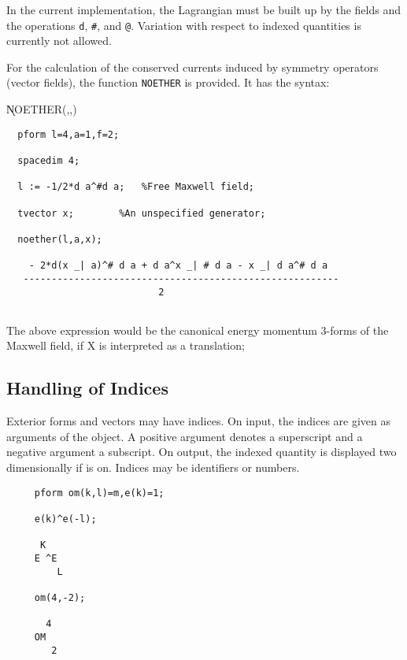 In the current implementation, the Lagrangian must be built up by the
fields and the operations \texttt{d}, \texttt{\#}, and \texttt{@}. Variation
with respect to indexed quantities is currently not allowed.

For the calculation of the conserved currents induced by symmetry
operators (vector fields), the function \texttt{NOETHER}\label{NOETHER}
\hypertarget{operator:NOETHER}{}
is provided.  It has the syntax:

\hspace*{2em}
\k{NOETHER}(,,)

\example{}
\begin{verbatim}
  pform l=4,a=1,f=2;

  spacedim 4;

  l := -1/2*d a^#d a;   %Free Maxwell field;

  tvector x;        %An unspecified generator;

  noether(l,a,x);

    - 2*d(x _| a)^# d a + d a^x _| # d a - x _| d a^# d a
   --------------------------------------------------------
                           2


\end{verbatim}

The above expression would be the canonical energy
momentum 3-forms of the Maxwell field, if X is interpreted
as a translation;



\subsection{Handling of Indices}
Exterior forms and vectors may have indices.  On input, the indices
are given as arguments of the object.  A positive argument denotes a
superscript and a negative argument a subscript.  On output, the
indexed quantity is displayed two dimensionally if  is on.
Indices may be identifiers or numbers.

\example{}

\begin{verbatim}
     pform om(k,l)=m,e(k)=1;

     e(k)^e(-l);

      K
     E ^E
         L

     om(4,-2);

       4
     OM
        2
\end{verbatim}


